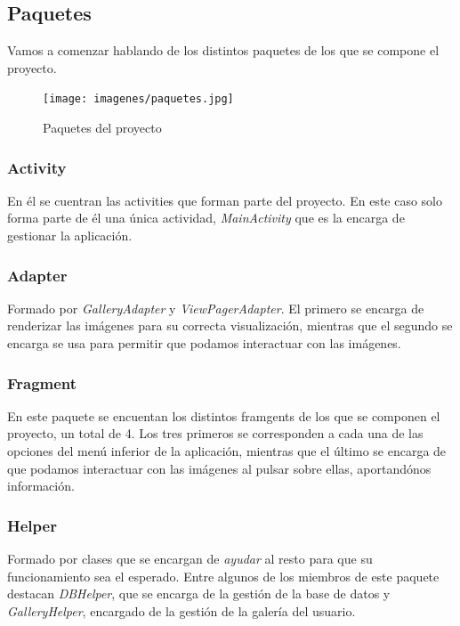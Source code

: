 \subsection{Paquetes}

Vamos a comenzar hablando de los distintos paquetes de los que se compone el proyecto.

\begin{figure}[H] %
\centering
\texttt{[image: imagenes/paquetes.jpg]}  %
\label{paquetes}
\caption{Paquetes del proyecto}
\end{figure}

\subsubsection{Activity}

En él se cuentran las activities que forman parte del proyecto. En este caso solo forma parte de él una única actividad, \textit{MainActivity} que es la encarga de gestionar la aplicación.

\subsubsection{Adapter}

Formado por \textit{GalleryAdapter} y \textit{ViewPagerAdapter}. El primero se encarga de renderizar las imágenes para su correcta visualización, mientras que el segundo se encarga se usa para permitir que podamos interactuar con las imágenes.

\subsubsection{Fragment}

En este paquete se encuentan los distintos framgents de los que se componen el proyecto, un total de 4. Los tres primeros se corresponden a cada una de las opciones del menú inferior de la aplicación, mientras que el último se encarga de que podamos interactuar con las imágenes al pulsar sobre ellas, aportandónos información.

\subsubsection{Helper}

Formado por clases que se encargan de \textit{ayudar} al resto para que su funcionamiento sea el esperado. Entre algunos de los miembros de este paquete destacan \textit{DBHelper}, que se encarga de la gestión de la base de datos y \textit{GalleryHelper}, encargado de la gestión de la galería del usuario.

